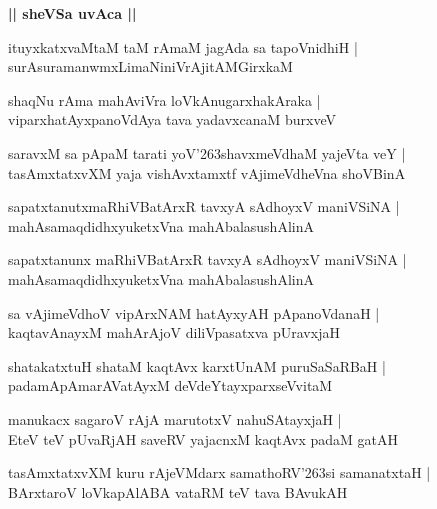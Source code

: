\documentclass[twoside,12pt,openright]{book}
\def\S{\char'263}
\newcounter{shloka}[chapter]
\def\uvaca#1{\centerline{{\large\textbf{#1}}}}
\begin{document}
\uvaca{|| sheVSa uvAca ||}

\begin{shloka}%
ituyxkatxvaMtaM taM rAmaM jagAda sa tapoVnidhiH |\\
surAsuramanwmxLimaNiniVrAjitAMGirxkaM 
\end{shloka}

\begin{shloka}%
shaqNu rAma mahAviVra loVkAnugarxhakAraka |\\
viparxhatAyxpanoVdAya tava yadavxcanaM burxveV
\end{shloka}

\begin{shloka}%
saravxM sa pApaM tarati yoV\S shavxmeVdhaM yajeVta veY |\\
tasAmxtatxvXM yaja vishAvxtamxtf vAjimeVdheVna shoVBinA
\end{shloka}

\begin{shloka}%
sapatxtanutxmaRhiVBatArxR tavxyA sAdhoyxV maniVSiNA |\\
mahAsamaqdidhxyuketxVna mahAbalasushAlinA
\end{shloka}

\begin{shloka}%
sapatxtanunx maRhiVBatArxR tavxyA sAdhoyxV maniVSiNA |\\
mahAsamaqdidhxyuketxVna mahAbalasushAlinA 
\end{shloka}

\begin{shloka}%
sa vAjimeVdhoV vipArxNAM hatAyxyAH pApanoVdanaH |\\
kaqtavAnayxM mahArAjoV diliVpasatxva pUravxjaH 
\end{shloka}

\begin{shloka}%
shatakatxtuH shataM kaqtAvx karxtUnAM puruSaSaRBaH |\\
padamApAmarAVatAyxM deVdeYtayxparxseVvitaM 
\end{shloka}

\begin{shloka}%
manukacx sagaroV rAjA marutotxV nahuSAtayxjaH |\\
EteV teV pUvaRjAH saveRV yajacnxM kaqtAvx padaM gatAH 
\end{shloka}

\begin{shloka}%
tasAmxtatxvXM kuru rAjeVMdarx samathoRV\S si samanatxtaH |\\
BArxtaroV loVkapAlABA vataRM teV tava BAvukAH
\end{shloka}
\end{document}
